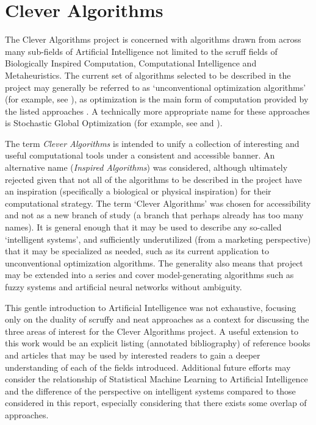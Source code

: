 \documentclass[a4paper, 11pt]{article}
\begin{document}
% 
% 
\section{Clever Algorithms}
\label{sec:clever_algorithms}
The Clever Algorithms project is concerned with algorithms drawn from across many sub-fields of Artificial Intelligence not limited to the scruff fields of Biologically Inspired Computation, Computational Intelligence and Metaheuristics. 
The current set of algorithms selected to be described in the project may generally be referred to as `unconventional optimization algorithms' (for example, see \cite{Corne1999}), as optimization is the main form of computation provided by the listed approaches \cite{Brownlee2010b}. A technically more appropriate name for these approaches is Stochastic Global Optimization (for example, see \cite{Weise2007} and \cite{Luke2009}).

The term \emph{Clever Algorithms} is intended to unify a collection of interesting and useful computational tools under a consistent and accessible banner. An alternative name (\emph{Inspired Algorithms}) was considered, although ultimately rejected given that not all of the algorithms to be described in the project have an inspiration (specifically a biological or physical inspiration) for their computational strategy. The term `Clever Algorithms' was chosen for accessibility and not as a new branch of study (a branch that perhaps already has too many names). It is general enough that it may be used to describe any so-called `intelligent systems', and sufficiently underutilized (from a marketing perspective) that it may be specialized as needed, such as its current application to unconventional optimization algorithms. The generality also means that project may be extended into a series and cover model-generating algorithms such as fuzzy systems and artificial neural networks without ambiguity.

This gentle introduction to Artificial Intelligence was not exhaustive, focusing only on the duality of scruffy and neat approaches as a context for discussing the three areas of interest for the Clever Algorithms project. A useful extension to this work would be an explicit listing (annotated bibliography) of reference books and articles that may be used by interested readers to gain a deeper understanding of each of the fields introduced. Additional future efforts may consider the relationship of Statistical Machine Learning to Artificial Intelligence and the difference of the perspective on intelligent systems compared to those considered in this report, especially considering that there exists some overlap of approaches. 



\end{document}
